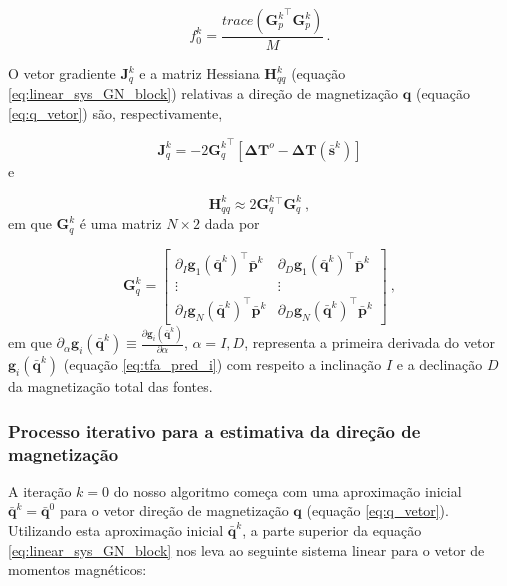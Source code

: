 \begin{equation}
f_{0}^{k} = \dfrac{trace \left({\mathbf{G}_{p}^{k}}^{\top} \mathbf{G}_{p}^{k} \right)}{M} \, .
\label{eq:norm_factor}
\end{equation}

O vetor gradiente $\mathbf{J}_{q}^{k}$ e a matriz Hessiana $\mathbf{H}_{qq}^{k}$ (equação \ref{eq:linear_sys_GN_block}) relativas a direção de magnetização $\mathbf{q}$ (equação \ref{eq:q_vetor}) são, respectivamente, 

\begin{equation}
\mathbf{J}_{q}^{k} = -2 {\mathbf{G}_{q}^{k}}^{\top} 
\left[ \mathbf{\Delta T}^{o} - \mathbf{\Delta T} (\bar{\mathbf{s}}^{k}) \right]
\label{eq:grad_q}
\end{equation}
e

\begin{equation}
\mathbf{H}_{qq}^{k} \approx 2 {\mathbf{G}_{q}^{k}}{^\top} \mathbf{G}_{q}^{k} \: ,
\label{eq:hess_q}
\end{equation}
em que $\mathbf{G}_{q}^{k}$ é uma matriz $N \times 2$ dada por 

\begin{equation}
\mathbf{G}_{q}^{k} = \begin{bmatrix}
\partial_{I} \mathbf{g}_{1}(\bar{\mathbf{q}}^{k})^{\top} \bar{\mathbf{p}}^{k} & 
\partial_{D} \mathbf{g}_{1}(\bar{\mathbf{q}}^{k})^{\top} \bar{\mathbf{p}}^{k} \\
\vdots & \vdots  \\
\partial_{I} \mathbf{g}_{N}(\bar{\mathbf{q}}^{k})^{\top} \bar{\mathbf{p}}^{k} & 
\partial_{D} \mathbf{g}_{N}(\bar{\mathbf{q}}^{k})^{\top} \bar{\mathbf{p}}^{k} 
\end{bmatrix} \: ,
\label{eq:Gq}
\end{equation}
em que $\partial_{\alpha} \mathbf{g}_{i}(\bar{\mathbf{q}}^{k}) \equiv \frac{\partial \mathbf{g}_{i}(\bar{\mathbf{q}}^{k})}{\partial \alpha}$, $\alpha= I, D$, representa a primeira derivada do vetor $\mathbf{g}_{i}(\bar{\mathbf{q}}^{k})$ (equação \ref{eq:tfa_pred_i}) com respeito a inclinação $I$ e a declinação $D$ da magnetização total das fontes.

\subsubsection{Processo iterativo para a estimativa da direção de magnetização}

A iteração $k=0$ do nosso algoritmo começa com uma aproximação inicial $\bar{\mathbf{q}}^{k} = \bar{\mathbf{q}}^{0}$ para o vetor direção de magnetização $\mathbf{q}$ (equação \ref{eq:q_vetor}). Utilizando esta aproximação inicial $\bar{\mathbf{q}}^{k}$, a parte superior da equação \ref{eq:linear_sys_GN_block} nos leva ao seguinte sistema linear para o vetor de momentos magnéticos:


